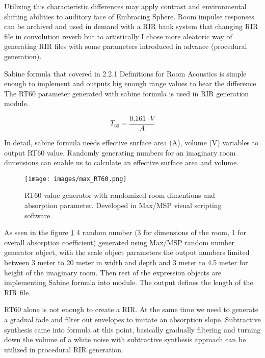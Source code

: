         Utilizing this characteristic differences may apply contrast and environmental shifting abilities to auditory face of Embracing Sphere. Room impulse responses can be archived and used in demand with a RIR bank system that changing RIR file in convolution reverb but to artistically I chose more aleatoric way of generating RIR files with some parameters introduced in advance (procedural generation).\par

        Sabine formula that covered in 2.2.1 Definitions for Room Acoustics is simple enough to implement and outputs big enough range values to hear the difference. The RT60 parameter generated with sabine formula is used in RIR generation module.\par
        
        $$T_{60} = \frac{0.161 \cdot V}{A}$$
        
        In detail, sabine formula needs effective surface area (A), volume (V) variables to output RT60 value. Randomly generating numbers for an imaginary room dimensions can enable us to calculate an effective surface area and volume.\par

        \begin{figure}[H]
            \centering
            \texttt{[image: images/max\_RT60.png]}
            \caption{RT60 value generator with randomized room dimentions and absorption parameter. Developed in Max/MSP visual scripting software.}
            \label{fig:RT60_MAX}
        \end{figure}
        
        As seen in the figure \ref{fig:RT60_MAX} 4 random number (3 for dimensions of the room, 1 for overall absorption coefficient) generated using Max/MSP random number generator object, with the scale object parameters the output numbers limited between 3 meter to 20 meter in width and depth and 3 meter to 4.5 meter for height of the imaginary room. Then rest of the expression objects are implementing Sabine formula into module. The output defines the length of the RIR file.\par

        RT60 alone is not enough to create a RIR. At the same time we need to generate a gradual fade and filter out envelopes to imitate an absorption slope. Subtractive synthesis came into formula at this point, basically gradually filtering and turning down the volume of a white noise with subtractive synthesis approach can be utilized in procedural RIR generation.\par

